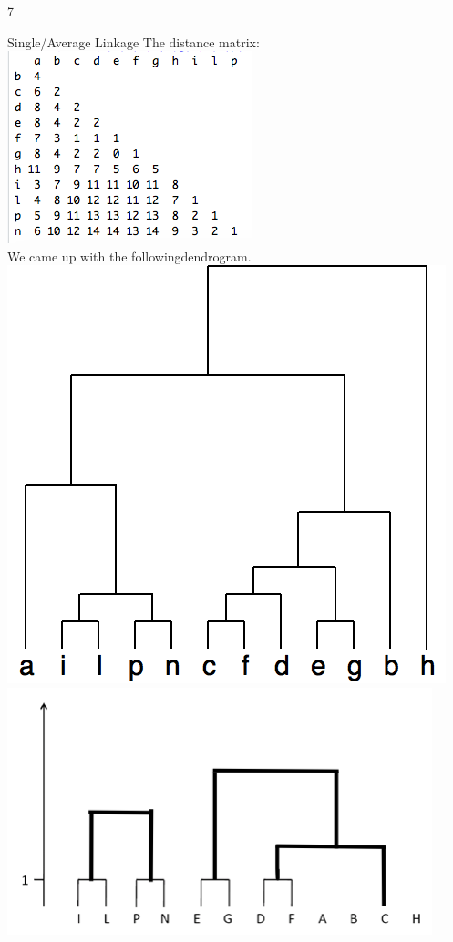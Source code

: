 \documentclass{article}
\begin{document}
    \begin{ukon-infie}[12.12.17]{7}

        \begin{exercise}[p=7]{Single/Average Linkage}  
        \question{}
        {
        	The distance matrix:\\
        	\includegraphics[scale=0.5]{distance_matrix.png}\\
        	
        	We came up with the followingdendrogram. \\
        	\includegraphics[scale=0.6]{cluster_tree.png}
        }
    	\question{}
    	{
    		\includegraphics[scale=0.6]{avg_cluster_tree_continued.png}	
    	}


\end{exercise}
\end{ukon-infie}
\end{document}

